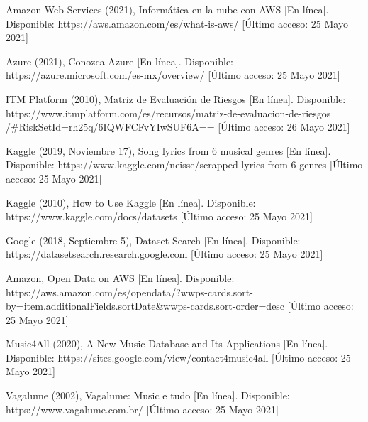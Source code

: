\documentclass[12pt, a4paper, titlepage]{report}
\begin{document}
\begin{thebibliography}{20}
	Amazon Web Services (2021), Informática en la nube con AWS [En línea]. Disponible: https://aws.amazon.com/es/what-is-aws/ [Último acceso: 25 Mayo 2021]
	
	Azure (2021), Conozca Azure [En línea]. Disponible: https://azure.microsoft.com/es-mx/overview/ [Último acceso: 25 Mayo 2021]
	
	ITM Platform (2010), Matriz de Evaluación de Riesgos [En línea]. Disponible: https://www.itmplatform.com/es/recursos/matriz-de-evaluacion-de-riesgos
	/\#RiskSetId=rh25q/6IQWFCFvYIwSUF6A== [Último acceso: 26 Mayo 2021]
	
	Kaggle (2019, Noviembre 17), Song lyrics from 6 musical genres [En línea]. Disponible: https://www.kaggle.com/neisse/scrapped-lyrics-from-6-genres [Último acceso: 25 Mayo 2021]
	
	Kaggle (2010), How to Use Kaggle [En línea]. Disponible: https://www.kaggle.com/docs/datasets [Último acceso: 25 Mayo 2021]
	
	Google (2018, Septiembre 5), Dataset Search [En línea]. Disponible: https://datasetsearch.research.google.com [Último acceso: 25 Mayo 2021]
	
	Amazon, Open Data on AWS [En línea]. Disponible: https://aws.amazon.com/es/opendata/?wwps-cards.sort-by=item.additionalFields.sortDate\&wwps-cards.sort-order=desc [Último acceso: 25 Mayo 2021]
	
	Music4All (2020), A New Music Database and Its Applications [En línea]. Disponible: https://sites.google.com/view/contact4music4all [Último acceso: 25 Mayo 2021]
	
	Vagalume (2002), Vagalume: Music e tudo [En línea]. Disponible: https://www.vagalume.com.br/ [Último acceso: 25 Mayo 2021]
	
\end{thebibliography}	
\end{document}
